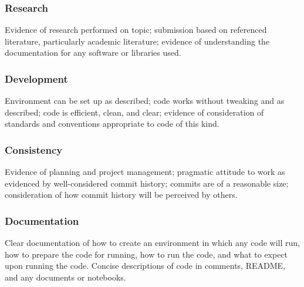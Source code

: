 \documentclass[a4paper, 12pt]{scrartcl}
\begin{document}
    \subsubsection*{Research}
    Evidence of research performed on topic; submission based on referenced literature, particularly academic literature; evidence of understanding the documentation for any software or libraries used.
    \subsubsection*{Development}
    Environment can be set up as described; code works without tweaking and as described; code is efficient, clean, and clear; evidence of consideration of standards and conventions appropriate to code of this kind.
    \subsubsection*{Consistency}
    Evidence of planning and project management; pragmatic attitude to work as evidenced by well-considered commit history; commits are of a reasonable size; consideration of how commit history will be perceived by others.
    \subsubsection*{Documentation}
    Clear documentation of how to create an environment in which any code will run, how to prepare the code for running, how to run the code, and what to expect upon running the code. Concise descriptions of code in comments, README, and any documents or notebooks.
    
  
  
  
\end{document}
